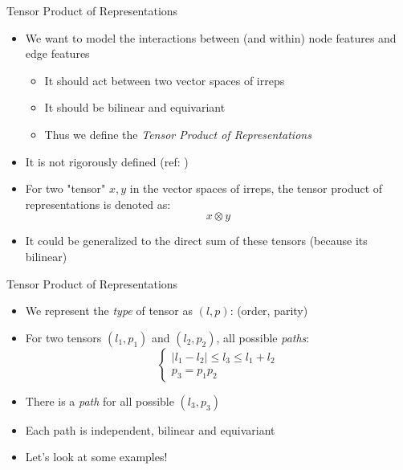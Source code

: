 \documentclass[pdf,serif]{beamer}
\newcommand{\empr}[1]{{\color{BerkeleyBlue}\emph{#1}}}
\begin{document}
\begin{frame}{Tensor Product of Representations}
    \begin{itemize}
        \item We want to model the interactions between (and within) node features and edge features
        \begin{itemize}
            \item It should act between two vector spaces of irreps
            \item It should be bilinear and equivariant
            \item Thus we define the \empr{Tensor Product of Representations}
        \end{itemize}
        \item It is not rigorously defined (ref: \citet{geiger2022e3nn})
        \item For two "tensor" $x, y$ in the vector spaces of irreps, the tensor product of representations is denoted as:
        $$x\otimes y$$
        \item It could be generalized to the direct sum of these tensors (because its bilinear)
    \end{itemize}
\end{frame}

\begin{frame}{Tensor Product of Representations}
    \begin{itemize}
        \item We represent the \empr{type} of tensor as $(l, p)$: (order, parity)
        \item For two tensors $(l_1, p_1)$ and $(l_2, p_2)$, all possible \empr{paths}:
        \[\begin{cases}
            |l_1-l_2|\leq l_3 \leq l_1+l_2\\
            p_3 = p_1p_2
        \end{cases}\]
        \item There is a \empr{path} for all possible $(l_3, p_3)$
        \item Each path is independent, bilinear and equivariant
        \item Let's look at some examples!
    \end{itemize}
\end{frame}
\end{document}
